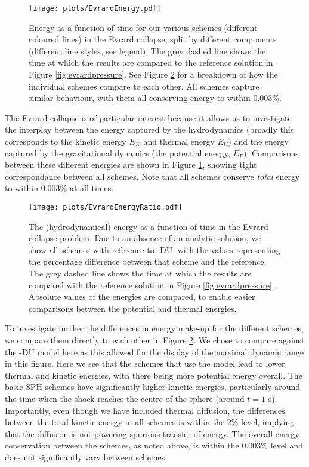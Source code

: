 \begin{figure}
    \centering
    \texttt{[image: plots/EvrardEnergy.pdf]}
    \vspace{-0.7cm}
    \caption{Energy as a function of time for our various schemes (different
    coloured lines) in the Evrard collapse, split by different components
    (different line styles, see legend). The grey dashed line shows the
    time at which the results are compared to the reference solution
    in Figure \ref{fig:evrardpressure}. See Figure \ref{fig:evrardenergy}
    for a breakdown of how the individual schemes compare to each other.
    All schemes capture similar behaviour, with them all conserving energy
    to within 0.003\%.}
    \label{fig:evrardenergytotal}
\end{figure}

The Evrard collapse is of particular interest because it allows us to
investigate the interplay between the energy captured by the hydrodynamics
(broadly this corresponds to the kinetic energy $E_K$ and thermal energy
$E_U$) and the energy captured by the gravitational dynamics (the potential
energy, $E_P$). Comparisons between these different energies are shown in
Figure \ref{fig:evrardenergytotal}, showing tight correspondance between all
schemes. Note that all schemes conserve \emph{total} energy to within 0.003\%
at all times.

\begin{figure}
    \centering
    \texttt{[image: plots/EvrardEnergyRatio.pdf]}
    \vspace{-0.4cm}
    \caption{The (hydrodynamical) energy as a function of time in the Evrard
    collapse problem. Due to an absence of an analytic solution, we show all
    schemes with reference to \anarchy{}-DU, with the values representing the
    percentage difference between that scheme and the reference. The grey
    dashed line shows the time at which the results are compared with the
    reference solution in Figure \ref{fig:evrardpressure}. Absolute values
    of the energies are compared, to enable easier comparisons between the 
    potential and thermal energies.}
    \label{fig:evrardenergy}
\end{figure}

To investigate further the differences in energy make-up for the different
schemes, we compare them directly to each other in Figure
\ref{fig:evrardenergy}. We chose to compare against the \anarchy{}-DU model
here as this allowed for the display of the maximal dynamic range in this
figure. Here we see that the schemes that use the \anarchy{} model lead to
lower thermal and kinetic energies, with there being more potential energy
overall. The basic SPH schemes have significantly higher kinetic energies,
particularly around the time when the shock reaches the centre of the sphere
(around $t=1$ s). Importantly, even though we have included thermal
diffusion, the differences between the total kinetic energy in all schemes is
within the 2\% level, implying that the diffusion is not powering spurious
transfer of energy. The overall energy conservation between the schemes, as noted
above, is within the 0.003\% level and does not significantly vary
between schemes.